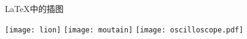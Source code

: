 \documentclass{article}
\begin{document}
	\LaTeX{}中的插图
	
	\texttt{[image: lion]}
	\texttt{[image: moutain]}
	\texttt{[image: oscilloscope.pdf]}
\end{document}
